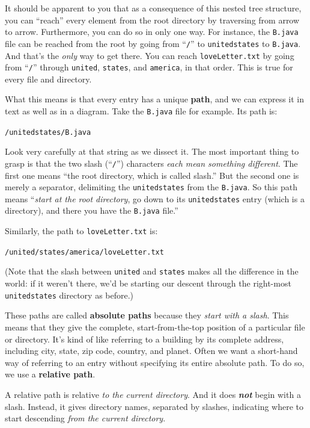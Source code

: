 It should be apparent to you that as a consequence of this nested tree
structure, you can ``reach'' every element from the root directory by
traversing from arrow to arrow. Furthermore, you can do so in only one way.
For instance, the \texttt{B.java} file can be reached from the root by going
from ``\texttt{/}'' to \texttt{unitedstates} to \texttt{B.java}. And that's the
\textit{only} way to get there. You can reach \texttt{loveLetter.txt} by going
from ``\texttt{/}'' through \texttt{united}, \texttt{states}, and
\texttt{america}, in that order. This is true for every file and directory.

What this means is that every entry has a unique \textbf{path}, and we can
express it in text as well as in a diagram. Take the \texttt{B.java} file for
example. Its path is:

\quad\quad \texttt{/unitedstates/B.java}

Look very carefully at that string as we dissect it. The most important thing
to grasp is that the two slash (``\texttt{/}'') characters \textit{each mean
something different}. The first one means ``the root directory, which is
called slash.'' But the second one is merely a separator, delimiting the
\texttt{unitedstates} from the \texttt{B.java}. So this path means
``\textit{start at the root directory}, go down to its \texttt{unitedstates}
entry (which is a directory), and there you have the \texttt{B.java} file.''

Similarly, the path to \texttt{loveLetter.txt} is:

\quad\quad \texttt{/united/states/america/loveLetter.txt}

(Note that the slash between \texttt{united} and \texttt{states} makes all the
difference in the world: if it weren't there, we'd be starting our descent
through the right-most \texttt{unitedstates} directory as before.)

These paths are called \textbf{absolute paths} because they \textit{start with
a slash}. This means that they give the complete, start-from-the-top position
of a particular file or directory. It's kind of like referring to a building
by its complete address, including city, state, zip code, country, and planet.
Often we want a short-hand way of referring to an entry without specifying its
entire absolute path. To do so, we use a \textbf{relative path}.

A relative path is relative \textit{to the current directory}. And it does
\textit{\textbf{not}} begin with a slash. Instead, it gives directory names,
separated by slashes, indicating where to start descending \textit{from the
current directory}.

